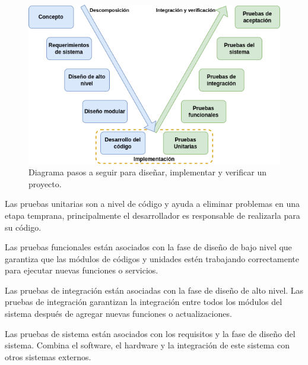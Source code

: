   \vspace{1cm}
  \begin{figure}[htbp]
      \centering
      \includegraphics[width=\linewidth]{./Figures/verif.png}
      \caption{Diagrama pasos a seguir para diseñar, implementar y verificar un proyecto.}\label{fig:verif}
  \end{figure}
  \vspace{1cm}


  Las pruebas unitarias son a nivel de código y ayuda a eliminar
  problemas en una etapa temprana, principalmente el desarrollador es responsable
  de realizarla para su código.

  Las pruebas funcionales están asociados con la fase de diseño de bajo nivel
  que garantiza que las módulos de códigos y unidades estén trabajando correctamente
  para ejecutar nuevas funciones o servicios.

  Las pruebas de integración están asociadas con la fase de diseño de alto
  nivel. Las pruebas de integración garantizan la integración entre todos
  los módulos del sistema después de agregar nuevas funciones o actualizaciones.

  Las pruebas de sistema están asociados con los requisitos y la fase de
  diseño del sistema. Combina el software, el hardware y la integración de este
  sistema con otros sistemas externos.

